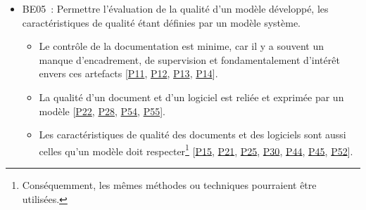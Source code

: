 {\begin{itemize}[label={}, leftmargin=*]
    \item BE05~: Permettre l'évaluation de la qualité d'un modèle développé, les caractéristiques de qualité étant définies par un modèle système.
    \begin{itemize}
    \item Le contrôle de la documentation est minime, car il y a souvent un manque d'encadrement, de supervision et fondamentalement d'intérêt envers ces artefacts   [\hyperref[paragraphe:P016]{P11}, \hyperref[paragraphe:P017]{P12}, \hyperref[paragraphe:P018]{P13}, \hyperref[paragraphe:P019]{P14}].
    \item La qualité d'un document et d'un logiciel est reliée et exprimée par un modèle [\hyperref[paragraphe:P030]{P22}, \hyperref[paragraphe:P038]{P28}, \hyperref[paragraphe:P070]{P54}, \hyperref[paragraphe:P072]{P55}].
    \item Les caractéristiques de qualité des documents et des logiciels sont aussi celles qu'un modèle doit respecter\footnote{Conséquemment, les mêmes méthodes ou techniques pourraient être utilisées.} [\hyperref[paragraphe:P020]{P15}, \hyperref[paragraphe:P029]{P21}, \hyperref[paragraphe:P034]{P25}, \hyperref[paragraphe:P040]{P30}, \hyperref[paragraphe:P058]{P44}, \hyperref[paragraphe:P059]{P45}, \hyperref[paragraphe:P068]{P52}].
    \end{itemize}

\end{itemize}
\leavevmode\vspace{-\baselineskip}
}{}{}
